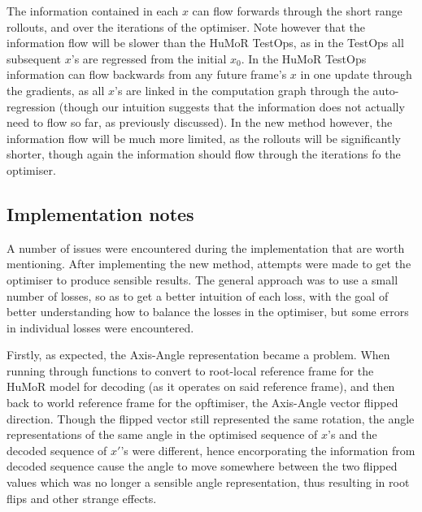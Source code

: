The information contained in each $x$ can flow forwards through the short range rollouts, and over the iterations of the optimiser. Note however that the information flow will be slower than the HuMoR TestOps, as in the TestOps all subsequent $x$'s are regressed from the initial $x_0$.
In the HuMoR TestOps information can flow backwards from any future frame's $x$ in one update through the gradients, as all $x$'s are linked in the computation graph through the auto-regression (though our intuition suggests that the information does not actually need to flow so far, as previously discussed). In the new method however, the information flow will be much more limited, as the rollouts will be significantly shorter, though again the information should flow through the iterations fo the optimiser.

\subsection{Implementation notes}

A number of issues were encountered during the implementation that are worth mentioning. After implementing the new method, attempts were made to get the optimiser to produce sensible results. The general approach was to use a small number of losses, so as to get a better intuition of each loss, with the goal of better understanding how to balance the losses in the optimiser, but some errors in individual losses were encountered.

Firstly, as expected, the Axis-Angle representation became a problem. When running through functions to convert to root-local reference frame for the HuMoR model for decoding (as it operates on said reference frame), and then back to world reference frame for the opftimiser, the Axis-Angle vector flipped direction. Though the flipped vector still represented the same rotation, the angle representations of the same angle in the optimised sequence of $x$'s and the decoded sequence of $x'$'s were different, hence encorporating the information from decoded sequence cause the angle to move somewhere between the two flipped values which was no longer a sensible angle representation, thus resulting in root flips and other strange effects.

